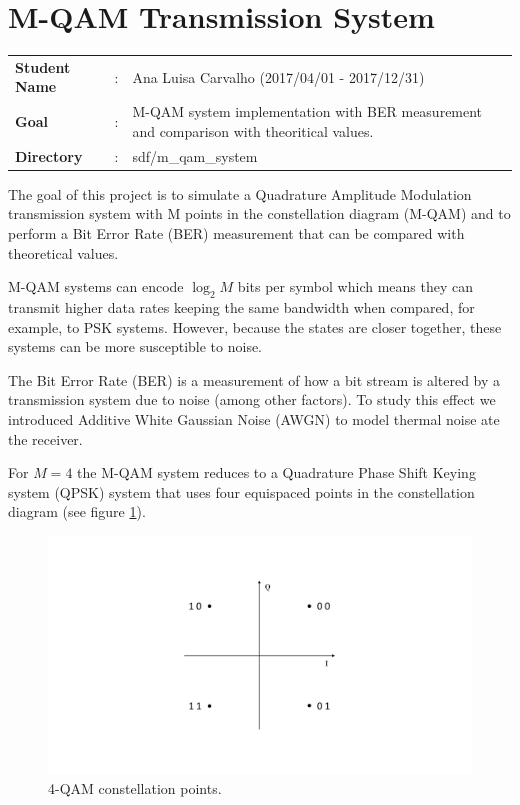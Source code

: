 \clearpage
\section{M-QAM Transmission System}

\begin{tcolorbox}	
	\begin{tabular}{p{2.75cm} p{0.2cm} p{10.5cm}} 	
		\textbf{Student Name}  &:& Ana Luisa Carvalho (2017/04/01 - 2017/12/31) \\
		\textbf{Goal}          &:& M-QAM system implementation with BER measurement and comparison with theoritical values.\\
		\textbf{Directory} &:& sdf/m\_qam\_system
	\end{tabular}
\end{tcolorbox}

The goal of this project is to simulate a Quadrature Amplitude Modulation transmission system with M points in the constellation diagram (M-QAM) and to perform a Bit Error Rate (BER) measurement that can be compared with theoretical values.

M-QAM systems can encode $\log_2 M$ bits per symbol which means they can transmit higher data rates keeping the same bandwidth when compared, for example, to PSK systems. However, because the states are closer together, these systems can be more susceptible to noise.

The Bit Error Rate (BER) is a measurement of how a bit stream is altered by a transmission system due to noise (among other factors). To study this effect we introduced Additive White Gaussian Noise (AWGN) to model thermal noise ate the receiver.

For $M=4$ the M-QAM system reduces to a Quadrature Phase Shift Keying system (QPSK) system that uses four equispaced points in the constellation diagram (see figure \ref{fig:const}).

\begin{figure}[h]
	\centering
	\includegraphics[clip, trim=1cm 3cm 1cm 3cm, width=\textwidth]{./sdf/m_qam_system/figures/MQAM_constellation.pdf}
	\caption{4-QAM constellation points.}
	\label{fig:const}
\end{figure}


